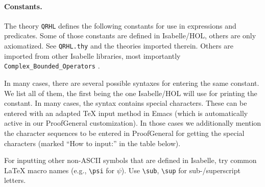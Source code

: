 \documentclass{article}
\begin{document}
\paragraph{Constants.} The theory \texttt{QRHL} defines the following
constants for use in expressions and predicates.
Some of those constants are defined in Isabelle/HOL, others are only axiomatized.
See \texttt{QRHL.thy} and the theories imported therein.
Others are imported from other Isabelle libraries, most importantly \texttt{Complex\_Bounded\_Operators} \cite{bounded-operators}.

In many cases, there
are several possible syntaxes for entering the same constant. We list
all of them, the first being the one Isabelle/HOL will use for
printing the constant. In many cases, the syntax contains special
characters. These can be entered with an adapted TeX input method in Emacs
(which is automatically active in our ProofGeneral customization). In
those cases we additionally mention the character sequences to be entered in ProofGeneral
for getting the special characters (marked ``How to input:'' in the table below).

For inputting other non-ASCII symbols that are defined in Isabelle, try common LaTeX macro names (e.g., \verb|\psi| for $\psi$).
Use \verb|\sub|, \verb|\sup| for sub-/superscript letters.

\newcommand\constdef[3]{#1\par
  \hskip1em\begin{minipage}{\hsize-1em}\raggedright $::#2$\end{minipage}%
  \ifx!#3!\hskip-1em\noindent\else\par\medskip\small(for #3)\fi}

\newcommand\subhead[1]{\multicolumn{2}{r@{}}{\footnotesize\bfseries #1}\\}

\newcommand\toolconst[1]{\index{#1@\textttOLD{#1} (Isabelle/HOL constant)}}
\end{document}
